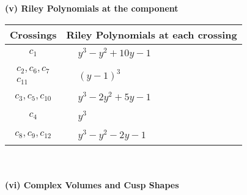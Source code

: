 \documentclass[1p]{elsarticle_modified}
\theoremstyle{definition}
\begin{document}
\newpage\renewcommand{\arraystretch}{1}
\flushleft \textbf{(v) Riley Polynomials at the component}\newline \\
\begin{tabular}{m{50pt}|m{274pt}}
Crossings & \hspace{64pt}Riley Polynomials at each crossing \\
\hline $$\begin{aligned}c_{1}\end{aligned}$$&$\begin{aligned}
&y^3- y^2+10 y-1
\end{aligned}$\\
\hline $$\begin{aligned}c_{2},c_{6},c_{7}\\c_{11}\end{aligned}$$&$\begin{aligned}
&(y-1)^3
\end{aligned}$\\
\hline $$\begin{aligned}c_{3},c_{5},c_{10}\end{aligned}$$&$\begin{aligned}
&y^3-2 y^2+5 y-1
\end{aligned}$\\
\hline $$\begin{aligned}c_{4}\end{aligned}$$&$\begin{aligned}
&y^3
\end{aligned}$\\
\hline $$\begin{aligned}c_{8},c_{9},c_{12}\end{aligned}$$&$\begin{aligned}
&y^3- y^2-2 y-1
\end{aligned}$\\
\hline
\end{tabular}\\~\\
\newpage\flushleft \textbf{(vi) Complex Volumes and Cusp Shapes}
\end{document}
